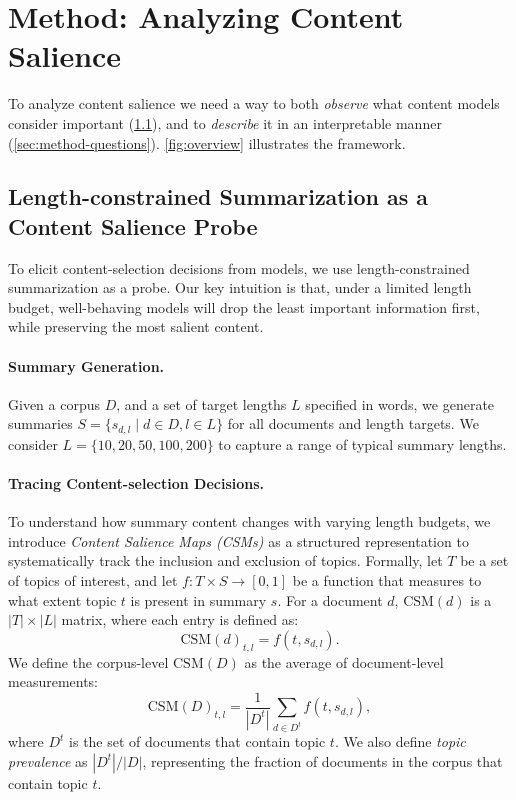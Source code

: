 \section{Method: Analyzing Content Salience}
\label{sec:method}
%
To analyze content salience we need a way to both \emph{observe} what content models consider important (\cref{sec:method-probe}), and to \emph{describe} it in an interpretable manner (\cref{sec:method-questions}).
\cref{fig:overview} illustrates the framework.
%

\subsection{Length-constrained Summarization as a Content Salience Probe}
\label{sec:method-probe}
To elicit content-selection decisions from models, we use length-constrained summarization as a probe. Our key intuition is that, under a limited length budget, well-behaving models will drop the least important information first, while preserving the most salient content.

\paragraph{Summary Generation.}
Given a corpus $D$, and a set of target lengths $L$ specified in words, we generate summaries $S = \{s_{d,l} \mid d \in D, l \in L \}$ for all documents and length targets.
We consider $L = \{10, 20, 50, 100, 200\}$ to capture a range of typical summary lengths.

\paragraph{Tracing Content-selection Decisions.}
To understand how summary content changes with varying length budgets, we introduce \textit{Content Salience Maps (CSMs)} as a structured representation to systematically track the inclusion and exclusion of topics.
Formally, let $T$ be a set of topics of interest, and let $f : T \times S \rightarrow [0,1]$ be a function that measures to what extent topic $t$ is present in summary $s$.
For a document $d$, $\text{CSM}(d)$ is a $|T|\times|L|$ matrix, where each entry is defined as:
%
\begin{equation}
    \text{CSM}(d)_{t,l} = f(t, s_{d,l}).
\end{equation}
%
We define the corpus-level $\text{CSM}(D)$ as the average of document-level measurements:
%
\begin{equation}\label{eqn:corpus-level-csm}
    \text{CSM}(D)_{t,l} = \frac{1}{|D^t|} \sum\limits_{d \in D^t}f(t,s_{d,l}),
\end{equation}
%
where $D^t$ is the set of documents that contain topic $t$.
We also define \emph{topic prevalence} as $|D^t|/|D|$, representing the fraction of documents in the corpus that contain topic $t$.

